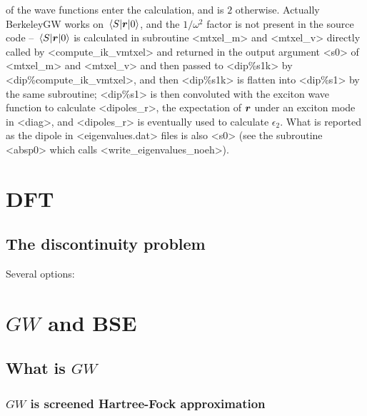 \documentclass[hyperref, a4paper, 12pt]{report}
\def\texttt#1{<#1>}%
\newcommand{\shortcode}[1]{\texttt{#1}}
\begin{document}
of the wave functions enter the calculation, 
and is $2$ otherwise. 
Actually BerkeleyGW works on $\mel*{S}{\vb*{r}}{0}$, 
and the $1 / \omega^2$ factor is not present in the source code
-- $\mel*{S}{\vb*{r}}{0}$ is calculated in subroutine \shortcode{mtxel_m} and \shortcode{mtxel_v}
directly called by \shortcode{compute_ik_vmtxel}
and returned in the output argument \shortcode{s0} of \shortcode{mtxel_m} and \shortcode{mtxel_v}
and then passed to \shortcode{dip\%s1k} by \shortcode{dip\%compute_ik_vmtxel},
and then \shortcode{dip\%s1k} is flatten into \shortcode{dip\%s1} by the same subroutine;
\shortcode{dip\%s1} is then convoluted with the exciton wave function 
to calculate \shortcode{dipoles_r}, the expectation of $\vb*{r}$ under an exciton mode in \shortcode{diag}, 
and \shortcode{dipoles_r} is eventually used to calculate $\epsilon_2$.
What is reported as the dipole in \shortcode{eigenvalues.dat} files is also \shortcode{s0}
(see the subroutine \shortcode{absp0} which calls \shortcode{write_eigenvalues_noeh}).

\chapter{DFT}

\section{The discontinuity problem}

Several options: \cite{andrade2011prediction,zheng2011improving}

\chapter{$GW$ and BSE}

\section{What is $GW$}

\subsection{$GW$ is screened Hartree-Fock approximation}
\end{document}
